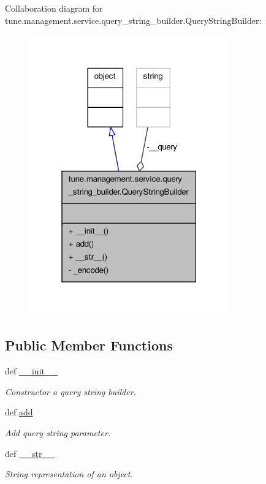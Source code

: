 Collaboration diagram for tune.\-management.\-service.\-query\-\_\-string\-\_\-builder.\-Query\-String\-Builder\-:
\nopagebreak
\begin{figure}[H]
\begin{center}
\leavevmode
\includegraphics[width=244pt]{classtune_1_1management_1_1service_1_1query__string__builder_1_1QueryStringBuilder__coll__graph}
\end{center}
\end{figure}
\subsection*{Public Member Functions}
\begin{DoxyCompactItemize}
\item 
def \hyperlink{classtune_1_1management_1_1service_1_1query__string__builder_1_1QueryStringBuilder_a6364c0e70322f6fd9fc6446285fb916f}{\-\_\-\-\_\-init\-\_\-\-\_\-}
\begin{DoxyCompactList}\small\item\em Constructor a query string builder. \end{DoxyCompactList}\item 
def \hyperlink{classtune_1_1management_1_1service_1_1query__string__builder_1_1QueryStringBuilder_a52936a3c60cbe5dc990ece2561c4d69e}{add}
\begin{DoxyCompactList}\small\item\em Add query string parameter. \end{DoxyCompactList}\item 
def \hyperlink{classtune_1_1management_1_1service_1_1query__string__builder_1_1QueryStringBuilder_a7239f3a1db6e6d797aa07867b1029b21}{\-\_\-\-\_\-str\-\_\-\-\_\-}
\begin{DoxyCompactList}\small\item\em String representation of an object. \end{DoxyCompactList}\end{DoxyCompactItemize}
